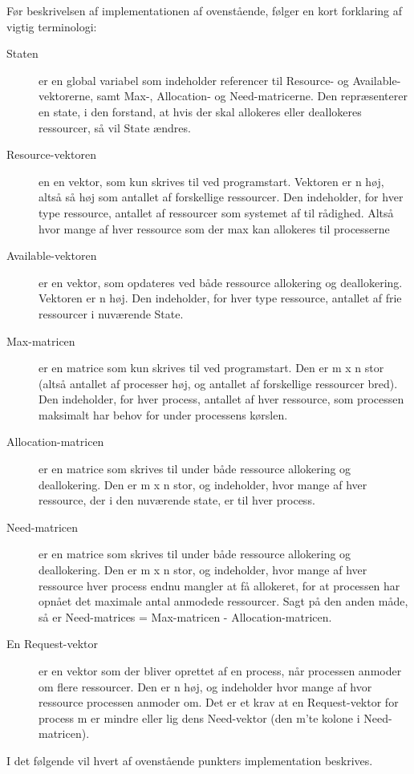 Før beskrivelsen af implementationen af ovenstående, følger en kort forklaring af vigtig terminologi:
\begin{description}
	\item[Staten] er en global variabel som indeholder referencer til Resource- og Available-vektorerne, samt Max-, Allocation- og Need-matricerne. Den repræsenterer en state, i den forstand, at hvis der skal allokeres eller deallokeres ressourcer, så vil State ændres.
	\item[Resource-vektoren] en en vektor, som kun skrives til ved programstart. Vektoren er n høj, altså så høj som antallet af forskellige ressourcer. Den indeholder, for hver type ressource, antallet af ressourcer som systemet af til rådighed. Altså hvor mange af hver ressource som der max kan allokeres til processerne
	\item[Available-vektoren] er en vektor, som opdateres ved både ressource allokering og deallokering. Vektoren er n høj. Den indeholder, for hver type ressource, antallet af frie ressourcer i nuværende State.
	\item[Max-matricen] er en matrice som kun skrives til ved programstart. Den er m x n stor (altså antallet af processer høj, og antallet af forskellige ressourcer bred). Den indeholder, for hver process, antallet af hver ressource, som processen maksimalt har behov for under processens kørslen.
	\item[Allocation-matricen] er en matrice som skrives til under både ressource allokering og deallokering. Den er m x n stor, og indeholder, hvor mange af hver ressource, der i den nuværende state, er til hver process.
	\item[Need-matricen] er en matrice som skrives til under både ressource allokering og deallokering. Den er m x n stor, og indeholder, hvor mange af hver ressource hver process endnu mangler at få allokeret, for at processen har opnået det maximale antal anmodede ressourcer. Sagt på den anden måde, så er Need-matrices = Max-matricen - Allocation-matricen.
	\item[En Request-vektor] er en vektor som der bliver oprettet af en process, når processen anmoder om flere ressourcer. Den er n høj, og indeholder hvor mange af hvor ressource processen anmoder om. Det er et krav at en Request-vektor for process m er mindre eller lig dens Need-vektor (den m'te kolone i Need-matricen).
\end{description}

I det følgende vil hvert af ovenstående punkters implementation beskrives.

